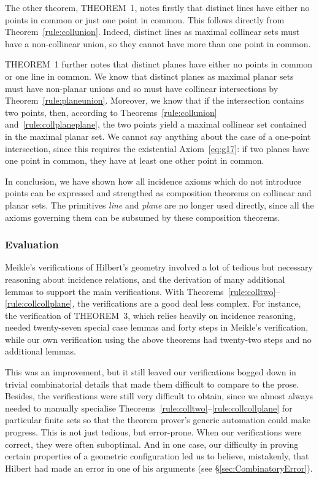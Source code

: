 The other theorem, THEOREM~1, notes firstly that distinct lines have either no points in common or just one point in common. This follows directly from Theorem~\ref{rule:collunion}. Indeed, distinct lines as maximal collinear sets must have a non-collinear union, so they cannot have more than one point in common.

THEOREM~1 further notes that distinct planes have either no points in common or one line in common. We know that distinct planes as maximal planar sets must have non-planar unions and so must have collinear intersections by Theorem~\ref{rule:planeunion}. Moreover, we know that if the intersection contains two points, then, according to Theorems~\ref{rule:collunion} and~\ref{rule:collplaneplane}, the two points yield a maximal collinear set contained in the maximal planar set. We cannot say anything about the case of a one-point intersection, since this requires the existential Axiom~\ref{eq:g17}: if two planes have one point in common, they have at least one other point in common.

In conclusion, we have shown how all incidence axioms which do not introduce points can be expressed and strengthed as composition theorems on collinear and planar sets. The primitives \emph{line} and \emph{plane} are no longer used directly, since all the axioms governing them can be subsumed by these composition theorems.

\subsubsection{Evaluation}
Meikle's verifications of Hilbert's geometry involved a lot of tedious but necessary reasoning about incidence relations, and the derivation of many additional lemmas to support the main verifications. With Theorems~\ref{rule:colltwo}--\ref{rule:collcollplane}, the verifications are a good deal less complex. For instance, the verification of THEOREM~3, which relies heavily on incidence reasoning, needed twenty-seven special case lemmas and forty steps in Meikle's verification, while our own verification using the above theorems had twenty-two steps and no additional lemmas. 

This was an improvement, but it still leaved our verifications bogged down in trivial combinatorial details that made them difficult to compare to the prose. Besides, the verifications were still very difficult to obtain, since we almost always needed to manually specialise Theorems~\ref{rule:colltwo}--\ref{rule:collcollplane} for particular finite sets so that the theorem prover's generic automation could make progress. This is not just tedious, but error-prone. When our verifications were correct, they were often suboptimal. And in one case, our difficulty in proving certain properties of a geometric configuration led us to believe, mistakenly, that Hilbert had made an error in one of his arguments (see \S\ref{sec:CombinatoryError}).

